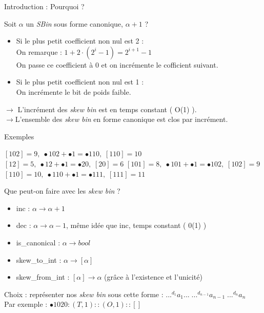 \documentclass{beamer}
\begin{document}
\begin{frame}{Introduction : Pourquoi ?}

 
Soit $\alpha$ un \textit{SBin} sous forme canonique, $\alpha + 1$ ?
\begin{itemize}
    \item Si le plus petit coefficient non nul est 2 :\\
    On remarque : $1 + 2 \cdot (2^i -1) = 2^{i + 1} - 1$\\
    On passe ce coefficient à 0 et on incrémente le cofficient suivant.
    \item Si le plus petit coefficient non nul est 1 :\\
    On incrémente le bit de poids faible.
\end{itemize}

$\rightarrow$ L'incrément des \textit{skew bin} est en temps constant ( O(1) ).\\
$\rightarrow$L'ensemble des \textit{skew bin} en forme canonique est clos par incrément.


\begin{block}{Exemples}

$ [102] = 9, \phantom{.} \bullet102 + \bullet 1 = \bullet 110, \phantom{.} [110] = 10 $
$ [12] = 5, \phantom{.} \bullet 12 + \bullet 1 = \bullet 20, \phantom{.} [20] = 6$
$ [101] = 8, \phantom{.} \bullet101 + \bullet1 = \bullet 102, \phantom{.} [102] = 9 $
$ [110] = 10, \phantom{.} \bullet110 + \bullet1 = \bullet111, \phantom{.} [111] = 11 $
\end{block}

\end{frame}

\begin{frame}{Que peut-on faire avec les \textit{skew bin} ?}

\begin{itemize}
    \item inc : $\alpha \rightarrow \alpha + 1$
    \item dec : $\alpha \rightarrow \alpha - 1$,  même idée que inc, temps constant ( 0(1) )
    \item is\_canonical : $\alpha \rightarrow bool$
    \item skew\_to\_int : $\alpha \rightarrow [\alpha]$
    \item skew\_from\_int : $[\alpha] \rightarrow \alpha$ (grâce à l'existence et l'unicité)
    
\end{itemize}

\vskip 1cm

\begin{center}
    Choix : représenter nos \textit{skew bin} sous cette forme :
$ ...^{d_1} a_1 ...\phantom{.} ...^{d_{n-1}} a_{n-1} \phantom{.}...^{d_n} a_n $\\
Par exemple :
$ \bullet 1020 : (T, 1) :: (O, 1) :: []$
\end{center}


\end{frame}
\end{document}
